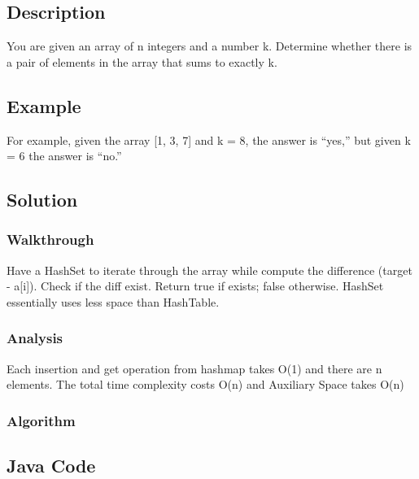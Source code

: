 \documentclass[]{book}
\begin{document}
\hypertarget{description-1}{%
\subsection{Description}\label{description-1}}

You are given an array of n integers and a number k. Determine whether there is a pair of elements in the array that
sums to exactly k.

\hypertarget{example}{%
\subsection{Example}\label{example}}

For example, given the array {[}1, 3, 7{]} and k = 8, the answer is ``yes,'' but given k = 6 the answer is ``no.''

\hypertarget{solution}{%
\subsection{Solution}\label{solution}}

\hypertarget{walkthrough-2}{%
\subsubsection{Walkthrough}\label{walkthrough-2}}

Have a HashSet to iterate through the array while compute the difference (target - a{[}i{]}). Check if the diff exist.
Return true if exists; false otherwise. HashSet essentially uses less space than HashTable.

\hypertarget{analysis-2}{%
\subsubsection{Analysis}\label{analysis-2}}

Each insertion and get operation from hashmap takes O(1) and there are n elements. The total time
complexity costs O(n) and Auxiliary Space takes O(n)

\hypertarget{algorithm-2}{%
\subsubsection{Algorithm}\label{algorithm-2}}

\hypertarget{java-code}{%
\subsection{Java Code}\label{java-code}}
\end{document}
